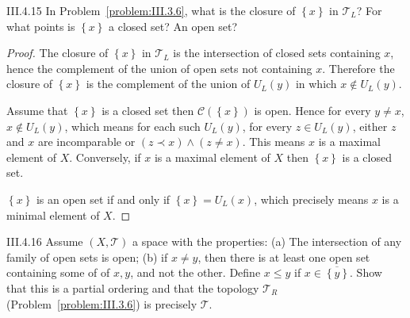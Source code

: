 \begin{problem}{III.4.15}
In Problem~\ref{problem:III.3.6}, what is the closure of \( \left\{ x \right\} \) in \( \mathscr{T}_{L} \)? For what points is \( \left\{ x \right\} \) a closed set? An open set?
\end{problem}

\begin{proof}
	The closure of \( \left\{ x \right\} \) in \( \mathscr{T}_{L} \) is the intersection of closed sets containing \( x \), hence the complement of the union of open sets not containing \(x\). Therefore the closure of \( \left\{ x \right\} \) is the complement of the union of \( U_{L}(y) \) in which \( x \notin U_{L}(y) \).

	Assume that \( \left\{ x \right\} \) is a closed set then \( \mathscr{C}(\left\{ x \right\}) \) is open. Hence for every \( y \ne x \), \( x \notin U_{L}(y) \), which means for each such \( U_{L}(y) \), for every \( z \in U_{L}(y) \), either \( z \) and \( x \) are incomparable or \( (z \prec x) \land (z \ne x) \). This means \( x \) is a maximal element of \( X \). Conversely, if \( x \) is a maximal element of \( X \) then \( \left\{ x \right\} \) is a closed set.

	\( \left\{ x \right\} \) is an open set if and only if \( \left\{ x \right\} = U_{L}(x) \), which precisely means \( x \) is a minimal element of \( X \).
\end{proof}

\begin{problem}{III.4.16}
Assume \( (X, \mathscr{T}) \) a space with the properties: (a) The intersection of any family of open sets is open; (b) if \(x\ne y\), then there is at least one open set containing some of of \(x, y\), and not the other. Define \( x\le y \) if \( x \in \overline{\left\{y\right\}} \). Show that this is a partial ordering and that the topology \( \mathscr{T}_{R} \) (Problem~\ref{problem:III.3.6}) is precisely \( \mathscr{T} \).
\end{problem}

